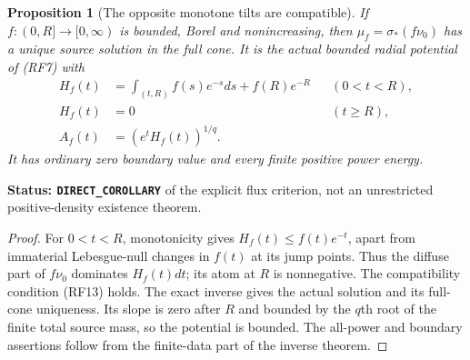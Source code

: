 \documentclass[11pt,a4paper]{article}
\numberwithin{equation}{section}
\newtheorem{proposition}[theorem]{Proposition}
\theoremstyle{definition}
\theoremstyle{remark}
\begin{document}
\begin{proposition}[The opposite monotone tilts are compatible]
\label{prop:r12-decreasing-density-solutions}
If $f:(0,R]\to[0,\infty)$ is bounded, Borel and
nonincreasing, then $\mu_f=\sigma_*(f\nu_0)$ has a
unique source solution in the full cone.  It is the
actual bounded radial potential of \textup{(RF7)} with
\[
 \begin{aligned}
 H_f(t)&=\int_{(t,R)}f(s)e^{-s}ds+f(R)e^{-R}
                                  &&(0<t<R),\\
 H_f(t)&=0 &&(t\ge R),\\
                  A_f(t)&=(e^tH_f(t))^{1/q}.
 \end{aligned}
 \tag{SD6}
\]
It has ordinary zero boundary value and every finite
positive power energy.
\end{proposition}

\noindent\textbf{Status: \texttt{DIRECT\_COROLLARY}}
of the explicit flux criterion, not an unrestricted
positive-density existence theorem.

\begin{proof}
For $0<t<R$, monotonicity gives
$H_f(t)\le f(t)e^{-t}$, apart from immaterial
Lebesgue-null changes in $f(t)$ at its jump points.
Thus the diffuse part of $f\nu_0$ dominates
$H_f(t)dt$; its atom at $R$ is nonnegative.
The compatibility condition \textup{(RF13)} holds.
The exact inverse gives the actual solution and its
full-cone uniqueness.  Its slope is zero after $R$
and bounded by the $q$th root of the finite total
source mass, so the potential is bounded.  The
all-power and boundary assertions follow from the
finite-data part of the inverse theorem.
\end{proof}
\end{document}
